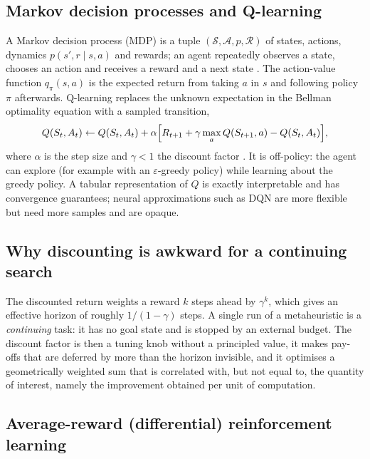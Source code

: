 \subsection{Markov decision processes and Q-learning}

A Markov decision process (MDP) is a tuple $(\mathcal S,\mathcal A,p,\mathcal R)$ of states, actions, dynamics $p(s',r\mid s,a)$ and rewards; an agent repeatedly observes a state, chooses an action and receives a reward and a next state \cite{sutton2018}. The action-value function $q_\pi(s,a)$ is the expected return from taking $a$ in $s$ and following policy $\pi$ afterwards. Q-learning replaces the unknown expectation in the Bellman optimality equation with a sampled transition,
\begin{equation}
Q(S_t,A_t)\leftarrow Q(S_t,A_t)+\alpha\Bigl[R_{t+1}+\gamma\max_a Q(S_{t+1},a)-Q(S_t,A_t)\Bigr],
\label{eq:qlearning}
\end{equation}
where $\alpha$ is the step size and $\gamma<1$ the discount factor \cite{watkins1992}. It is off-policy: the agent can explore (for example with an $\varepsilon$-greedy policy) while learning about the greedy policy. A tabular representation of $Q$ is exactly interpretable and has convergence guarantees; neural approximations such as DQN \cite{mnih2015} are more flexible but need more samples and are opaque.

\subsection{Why discounting is awkward for a continuing search}

The discounted return weights a reward $k$ steps ahead by $\gamma^k$, which gives an effective horizon of roughly $1/(1-\gamma)$ steps. A single run of a metaheuristic is a \emph{continuing} task: it has no goal state and is stopped by an external budget. The discount factor is then a tuning knob without a principled value, it makes pay-offs that are deferred by more than the horizon invisible, and it optimises a geometrically weighted sum that is correlated with, but not equal to, the quantity of interest, namely the improvement obtained per unit of computation.

\subsection{Average-reward (differential) reinforcement learning}

